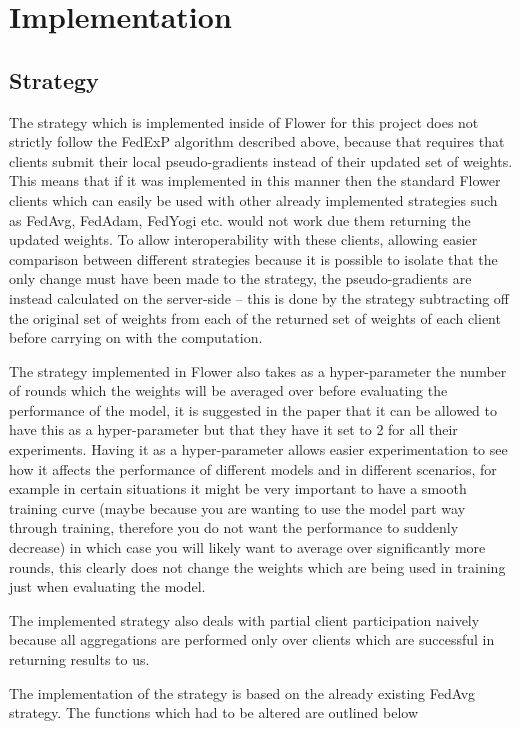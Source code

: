\documentclass{article}
\begin{document}
\section{Implementation}

\subsection{Strategy}

The strategy which is implemented inside of Flower for this project does not strictly follow the FedExP algorithm described above, because that requires that clients submit their local pseudo-gradients instead of their updated set of weights.  This means that if it was implemented in this manner then the standard Flower clients which can easily be used with other already implemented strategies such as FedAvg, FedAdam, FedYogi etc. would not work due them returning the updated weights.  To allow interoperability with these clients, allowing easier comparison between different strategies because it is possible to isolate that the only change must have been made to the strategy, the pseudo-gradients are instead calculated on the server-side -- this is done by the strategy subtracting off the original set of weights from each of the returned set of weights of each client before carrying on with the computation.

The strategy implemented in Flower also takes as a hyper-parameter the number of rounds which the weights will be averaged over before evaluating the performance of the model, it is suggested in the paper that it can be allowed to have this as a hyper-parameter but that they have it set to 2 for all their experiments.  Having it as a hyper-parameter allows easier experimentation to see how it affects the performance of different models and in different scenarios, for example in certain situations it might be very important to have a smooth training curve (maybe because you are wanting to use the model part way through training, therefore you do not want the performance to suddenly decrease) in which case you will likely want to average over significantly more rounds, this clearly does not change the weights which are being used in training just when evaluating the model.

The implemented strategy also deals with partial client participation naively because all aggregations are performed only over clients which are successful in returning results to us.  

The implementation of the strategy is based on the already existing FedAvg strategy.  The functions which had to be altered are outlined below
\end{document}
